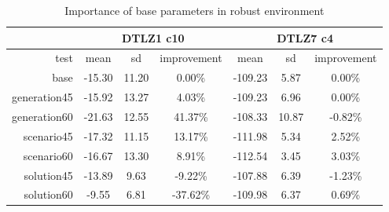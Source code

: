 \begin{table}[htb]
  \centering
  \begin{tabular}{r c c c c c c}
    & \multicolumn{3}{c}{DTLZ1 c10} & \multicolumn{3}{c}{DTLZ7 c4} \\
    \hline
    test & mean & sd & improvement & mean & sd & improvement \\
    \hline
    \hline
    base & -15.30 & 11.20 & 0.00\% & -109.23 & 5.87 & 0.00\% \\
    generation45 & -15.92 & 13.27 & 4.03\% & -109.23 & 6.96 & 0.00\% \\
    generation60 & -21.63 & 12.55 & 41.37\% & -108.33 & 10.87 & -0.82\% \\
    scenario45 & -17.32 & 11.15 & 13.17\% & -111.98 & 5.34 & 2.52\% \\
    scenario60 & -16.67 & 13.30 & 8.91\% & -112.54 & 3.45 & 3.03\% \\
    solution45 & -13.89 & 9.63 & -9.22\% & -107.88 & 6.39 & -1.23\% \\
    solution60 & -9.55 & 6.81 & -37.62\% & -109.98 & 6.37 & 0.69\% \\
    \hline
  \end{tabular}
  \caption{Importance of base parameters in robust environment}
  \label{t:base2_imp_2}
\end{table}


